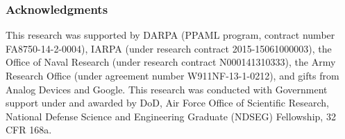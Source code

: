 \documentclass{article}
\begin{document}
\subsubsection*{Acknowledgments}
This research was supported by DARPA (PPAML program, contract number FA8750-14-2-0004), IARPA (under research contract 2015-15061000003), the Office of Naval Research (under research contract N000141310333), the Army Research Office (under agreement number W911NF-13-1-0212), and gifts from Analog Devices and Google.
This research was conducted with Government support under and awarded by DoD, Air Force Office of Scientific Research, National Defense Science and Engineering Graduate (NDSEG) Fellowship, 32 CFR 168a.



\end{document}
